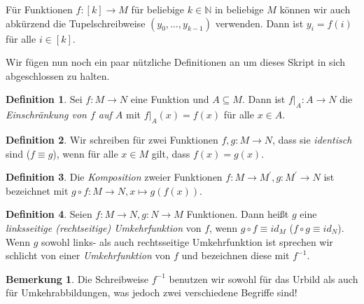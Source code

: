 \documentclass[11pt, a4paper]{article}
\theoremstyle{definition}
\newtheorem{definition}{Definition}[section]
\newtheorem*{remark*}{Bemerkung}
\theoremstyle{plain}
\numberwithin{equation}{section}
\begin{document}
Für Funktionen $f\colon [k] \to M$ für beliebige $k \in \mathbb{N}$ in beliebige $M$ können wir auch abkürzend die Tupelschreibweise $(y_0, \ldots, y_{k-1})$ verwenden. Dann ist $y_i = f(i)$ für alle $i \in [k]$.\par
Wir fügen nun noch ein paar nützliche Definitionen an um dieses Skript in sich abgeschlossen zu halten.
\begin{definition}
	Sei $f\colon M \to N$ eine Funktion und $A \subseteq M$. Dann ist $f\vert_A\colon A \to N$ die \textit{Einschränkung von $f$ auf $A$} mit $f\vert_A(x) = f(x)$ für alle $x \in A$.
\end{definition}
\begin{definition}
	Wir schreiben für zwei Funktionen $f, g\colon M \to N$, dass sie \textit{identisch} sind ($f \equiv g$), wenn für alle $x \in M$ gilt, dass $f(x) = g(x)$.
\end{definition}
\begin{definition}
	Die \textit{Komposition} zweier Funktionen $f\colon M \to M^\prime, g\colon M^\prime \to N$ ist bezeichnet mit $g \circ f\colon M \to N, x \mapsto g(f(x))$.
\end{definition}
\begin{definition}
	Seien $f\colon M \to N, g\colon N \to M$ Funktionen. Dann heißt $g$ eine \textit{linksseitige (rechtseitige) Umkehrfunktion} von $f$, wenn $g \circ f \equiv id_M$ ($f \circ g \equiv id_N$). Wenn $g$ sowohl links- als auch rechtsseitige Umkehrfunktion ist sprechen wir schlicht von einer \textit{Umkehrfunktion} von $f$ und bezeichnen diese mit $f^{-1}$.
\end{definition}
\begin{remark*}
	Die Schreibweise $f^{-1}$ benutzen wir sowohl für das Urbild als auch für Umkehrabbildungen, was jedoch zwei verschiedene Begriffe sind!
\end{remark*}
\end{document}
